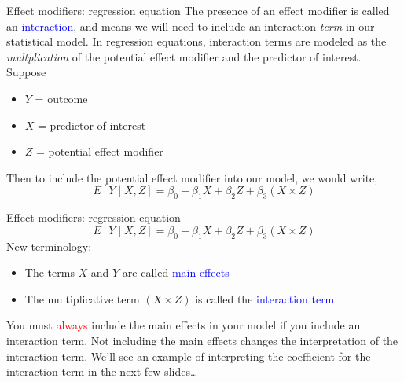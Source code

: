 \documentclass[10pt,t]{beamer}
\begin{document}
\begin{frame}{Effect modifiers: regression equation}
The presence of an effect modifier is called an \textcolor{blue}{interaction}, and means we will need to include an interaction \textit{term} in our statistical model. In regression equations, interaction terms are modeled as the \textit{multplication} of the potential effect modifier and the predictor of interest. Suppose
\vspace{0.3cm}

\begin{itemize}
	\item $Y$ = outcome
	\item $X$ = predictor of interest
	\item $Z$ = potential effect modifier
\end{itemize}

\vspace{0.3cm}

Then to include the potential effect modifier into our model, we would write,
$$
E[Y \mid X, Z] = \beta_0 + \beta_1 X + \beta_2 Z + \beta_3 (X \times Z)
$$
\end{frame}

\begin{frame}{Effect modifiers: regression equation}
$$
E[Y \mid X, Z] = \beta_0 + \beta_1 X + \beta_2 Z + \beta_3 (X \times Z)
$$
New terminology:

\vspace{0.3cm}

\begin{itemize}
	\item The terms $X$ and $Y$ are called \textcolor{blue}{main effects}
	\item The multiplicative term $(X \times Z)$ is called the \textcolor{blue}{interaction term}
\end{itemize}

\vspace{0.3cm}

You must \textcolor{red}{always} include the main effects in your model if you include an interaction term. Not including the main effects changes the interpretation of the interaction term. We'll see an example of interpreting the coefficient for the interaction term in the next few slides\dots

\end{frame}
\end{document}

